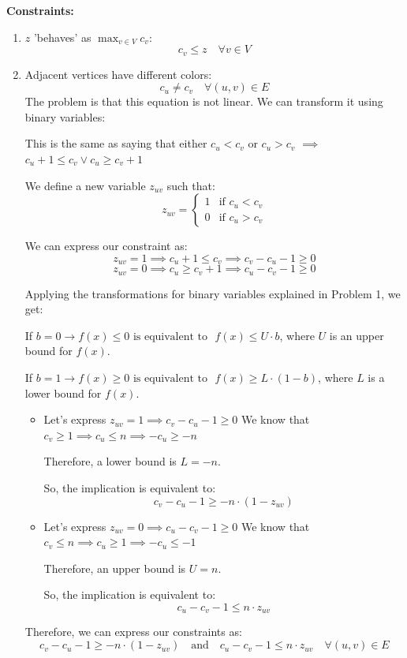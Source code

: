 \documentclass[a4paper,10pt]{article}
\begin{document}
\textbf{Constraints:}
\begin{enumerate}
  \item \(z\) 'behaves' as \(\max_{v \in V} c_v\):
  \[\boxed{c_v \leq z \quad \forall v \in V}\] 
  \item Adjacent vertices have different colors:
  \[\boxed{c_u \neq c_v \quad \forall (u,v) \in E}\]
  The problem is that this equation is not linear. We can transform it using binary variables:
  
  This is the same as saying that either \(c_u < c_v\) or \(c_u > c_v\) \(\implies\) \(c_u +1 \leq c_v \lor c_u \geq c_{v}+1 \)  

  We define a new variable \(z_{uv}\) such that:
  \[z_{uv} = \begin{cases}
    1 & \text{if } c_u < c_v \\
    0 & \text{if } c_u > c_v
  \end{cases}\]

  We can express our constraint as:
  \[
  z_{uv} = 1 \implies c_u + 1 \leq c_v \implies c_v - c_u -1 \geq 0
  \]
  \[
  z_{uv} = 0 \implies c_u \geq c_v + 1 \implies c_u - c_v -1 \geq 0
  \]

  Applying the transformations for binary variables explained in Problem 1, we get:

  If \(b=0 \longrightarrow f(x) \leq 0 \text{ is equivalent to } \) \(f(x) \leq U \cdot b\), where \(U\) is an upper bound for \(f(x)\).

  If \(b=1 \longrightarrow f(x) \geq 0 \text{ is equivalent to } \) \(f(x) \geq L \cdot (1-b)\), where \(L\) is a lower bound for \(f(x)\).

  \begin{itemize}
    \item Let's express \(z_{uv}=1 \implies c_{v} - c_u - 1 \geq 0\)
  We know that \(c_v \geq 1 \implies c_u \leq n \implies -c_u \geq -n\)
  
  Therefore, a lower bound is \(L = -n\).

  So, the implication is equivalent to:
  \[c_v - c_u - 1 \geq -n \cdot (1 - z_{uv})\]

    \item Let's express \(z_{uv}=0 \implies c_u - c_v - 1 \geq 0\)
  We know that \(c_v \leq n \implies c_u \geq 1 \implies -c_u \leq -1\)

  Therefore, an upper bound is \(U=n\).

  So, the implication is equivalent to:
  \[c_u - c_v - 1 \leq n \cdot z_{uv}\]
  \end{itemize}

  Therefore, we can express our constraints as:
  \[
  \boxed{c_v - c_u - 1 \geq -n \cdot (1 - z_{uv})} \quad \text{and} \quad \boxed{c_u - c_v - 1 \leq n \cdot z_{uv}} \quad \forall (u,v) \in E
  \]  

\end{enumerate}
\end{document}
